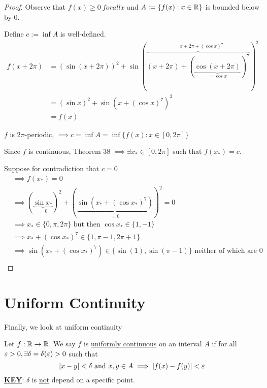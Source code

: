 \begin{proof}
    Observe that $f(x) \geq 0\ forall x$ and $A := \{ f(x) : x\in \mathbb R\}$ is bounded below by 0.

    Define $c := \inf A$ is well-defined. 
    \begin{align*}
        f(x + 2\pi) &= (\sin (x + 2\pi))^2 + \sin (\overbrace{(x + 2\pi) + (\underbrace{\cos (x + 2\pi)}_{=\cos x})^7}^{=x + 2\pi + (\cos x)^7})^2 \\
        &= (\sin x)^2 + \sin (x + (\cos x)^7)^2 \\
        &= f(x)
    \end{align*}

    $f$ is $2\pi$-periodic, 
    $\implies c = \inf A = \inf\{f(x): x \in \left[0, 2\pi\right]\}$

    Since $f$ is continuous, Theorem 38 $\implies \exists x_* \in \left[0, 2\pi\right]$ such that $f(x_*) = c$.
    
    Suppose for contradiction that $c = 0$
    \begin{align*}
        &\implies f(x_*) = 0 \\
        &\implies (\underbrace{\sin x_*}_{=0})^2 + (\underbrace{\sin (x_* + (\cos x_*)^7)}_{=0})^2 = 0 \\
        &\implies x_* \in \{0, \pi, 2\pi\}\text{ but then }\cos x_* \in \{1, -1\} \\
        &\implies x_* + (\cos x_*)^7 \in \{1, \pi-1, 2\pi + 1\} \\
        &\implies \sin(x_* + (\cos x_*)^7) \in \{\sin(1), \sin(\pi - 1)\} \text{ neither of which are } 0\\
    \end{align*} 
\end{proof}

\section{Uniform Continuity}

Finally, we look at uniform continuity

\begin{definition} \label{def:uniform}
    Let $f: \mathbb R \to \mathbb R$. We say $f$ is \underline{uniformly continuous} on an interval $A$ if
    for all $\varepsilon > 0, \exists \delta = \delta(\varepsilon) > 0$ such that 
    $$|x - y| < \delta\text{ and } x, y \in A \implies |f(x) - f(y)| < \varepsilon$$
    \underline{\textbf{KEY}}: $\delta$ is \underline{not} depend on a specific point. 
\end{definition}

